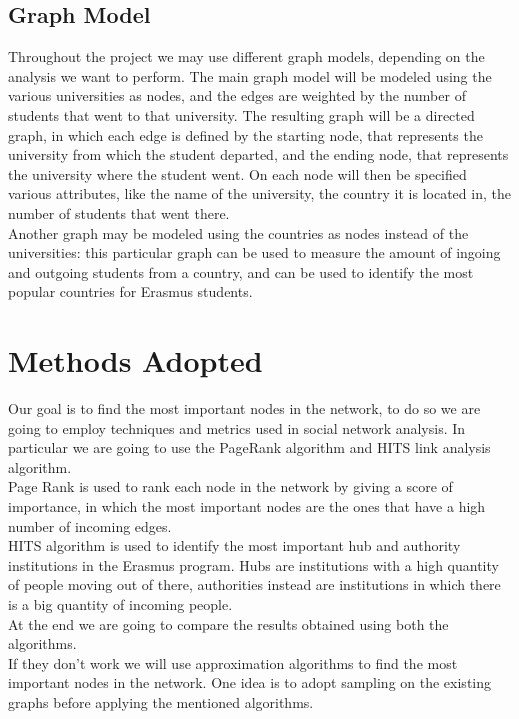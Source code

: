 \subsection{Graph Model}
    Throughout the project we may use different graph models, depending on the analysis we want to perform. The main graph model will be modeled using the various universities as nodes, and the edges are weighted by the number of students that went to that university. The resulting graph will be 
    a directed graph, in which each edge is defined by the starting node, that represents the university from which the student departed, and the ending node, that represents the university 
    where the student went.
    On each node will then be specified various attributes, like the name of the university, the country it is located in, the number of students that went there.
    \\
    Another graph may be modeled using the countries as nodes instead of the universities: this particular graph can be used to measure the amount of ingoing and outgoing students from a country, 
    and can be used to identify the most popular countries for Erasmus students.   

\section{Methods Adopted}
    Our goal is to find the most important nodes in the network, to do so we are going to employ techniques and metrics used in social network analysis. 
    In particular we are going to use the PageRank algorithm and HITS link analysis algorithm.
    \\Page Rank is used to rank each node in the network by giving a score of importance, in which the most important nodes are the ones that have a high number of incoming edges.
    \\HITS algorithm is used to identify the most important hub and authority institutions in the Erasmus program. Hubs are institutions with a 
    high quantity of people moving out of there, authorities instead are institutions in which there is a big quantity of incoming people.
    \\
    At the end we are going to compare the results obtained using both the algorithms.
    \\If they don't work we will use approximation algorithms to find the most important nodes in the network. 
    One idea is to adopt sampling on the existing graphs before applying the mentioned algorithms. 

